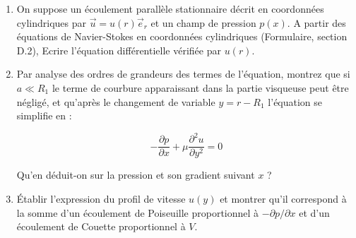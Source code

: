 \begin{enumerate}

\item On suppose un écoulement parallèle stationnaire décrit en coordonnées cylindriques par $\vec u=u(r) \vec{e}_r$ et un champ de pression $p(x)$. 
A partir des équations de Navier-Stokes en coordonnées cylindriques (Formulaire, section D.2), Ecrire l'équation différentielle vérifiée par $u(r)$.




  
\item 
Par analyse des ordres de grandeurs des termes de l'équation, montrez que si $a\ll R_1$ le terme de courbure apparaissant dans la partie visqueuse peut être négligé, et qu'après le changement de variable $y = r-R_1$ l'équation se simplifie en :

$$
-\frac{\partial p}{\partial x} + \mu \frac{\partial^2 u}{\partial y^2} = 0 %
$$





 Qu'en déduit-on sur la pression et son gradient suivant $x$ ?


\item 
Établir l'expression du profil de vitesse $u(y)$ et montrer qu'il correspond à la somme d'un écoulement de Poiseuille proportionnel à $-\partial p/\partial x$ et d'un écoulement de Couette proportionnel à $V$. 


\end{enumerate}
